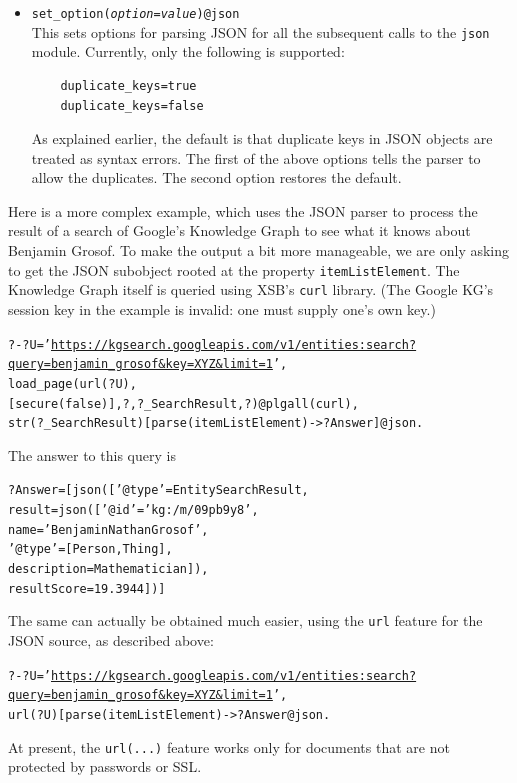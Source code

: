 \begin{itemize}
  Also note that if the JSON structure has more than one sub-object that
  satisfies the selection and duplicate keys are allowed
  (e.g., in \texttt{\{"a":1, "a":2\}} both 1 and 2 satisfy the selection)
  then only the first sub-object will be returned. (See below to learn about
  duplicate keys in JSON.)

\item \texttt{set\_option(\emph{option}=\emph{value})@\bs{}json}\\
  This sets options for parsing JSON for all the subsequent calls to the
  \texttt{\bs{}json} module. Currently, only the following is supported:
\begin{verbatim}
    duplicate_keys=true
    duplicate_keys=false
\end{verbatim}
  As explained earlier, the default is that duplicate keys in JSON objects
  are treated as syntax errors. The first of the above options tells the
  parser to allow the duplicates. The second option restores the default.
\end{itemize}

Here is a more complex example, which uses the JSON parser to
process the result of a search of
Google's Knowledge Graph to see what it knows about Benjamin Grosof.
To make the output a bit more manageable, we are only asking to get the
JSON subobject rooted at the property \texttt{itemListElement}.
The Knowledge Graph itself is queried using XSB's \texttt{curl}
library. 
(The Google KG's
session key in the example is invalid: one must supply one's own key.)
\begin{alltt}
?- ?U = '\url{https://kgsearch.googleapis.com/v1/entities:search?query=benjamin_grosof&key=XYZ&limit=1}',
   load_page(url(?U),
             [secure(false)], ?, ?_SearchResult, ?)@\bs{}plgall(curl),
   str(?_SearchResult)[parse(itemListElement) -> ?Answer]@\bs{}json.
\end{alltt}
The answer to this query is
\begin{alltt}
?Answer = [json(['@type' = EntitySearchResult,
                 result = json(['@id' = 'kg:/m/09pb9y8',
                                name = 'Benjamin Nathan Grosof',
                                '@type' = [Person, Thing],
                                description = Mathematician]),
                 resultScore = 19.3944])]
\end{alltt}

The same can actually be obtained much easier, using the
\texttt{url} feature for the JSON source, as described above:
\begin{alltt}
?- ?U = '\url{https://kgsearch.googleapis.com/v1/entities:search?query=benjamin_grosof&key=XYZ&limit=1}',
   url(?U)[ parse(itemListElement) -> ?Answer @\bs{}json.
\end{alltt}
At present, the \texttt{url(...)} feature works only for documents
that are not protected by passwords or SSL. 


